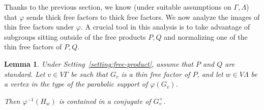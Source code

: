 \documentclass[a4paper,english,11pt]{article}
\newtheorem{lemma}[de]{Lemma}
\theoremstyle{definition}
\theoremstyle{remark}
\begin{document}
Thanks to the previous section, we know (under suitable assumptions on $\Gamma,\Lambda$) that $\varphi$ sends thick free factors to thick free factors. We now analyze the images of thin free factors under $\varphi$. A crucial tool in this analysis is to take advantage of subgroups sitting outside of the free products $P,Q$ and normalizing one of the thin free factors of $P,Q$.


\begin{lemma}\label{lemma:allumette}
Under Setting~\ref{setting:free-product}, assume that $P$ and $Q$ are standard. Let $v\in V\Gamma$ be such that $G_v$ is a thin free factor of $P$, and let $w\in V\Lambda$ be a vertex in the type of the parabolic support of $\varphi(G_v)$.

Then $\varphi^{-1}(H_w)$ is contained in a conjugate of $G_v^+$.
\end{lemma}
\end{document}
